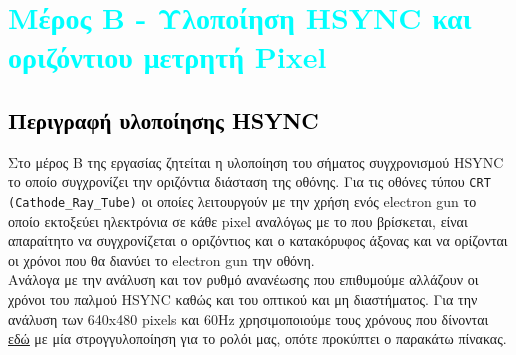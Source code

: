 \documentclass[12pt,a4paper]{article}
\begin{document}
	
	
	\section{\textcolor{cyan}{Μέρος Β - Υλοποίηση HSYNC και οριζόντιου μετρητή Pixel} }
	\subsection{\textcolor{black}{Περιγραφή υλοποίησης HSYNC}}
	Στο μέρος Β της εργασίας ζητείται η υλοποίηση του σήματος συγχρονισμού HSYNC το οποίο συγχρονίζει την οριζόντια διάσταση της οθόνης. Για τις οθόνες τύπου \verb|CRT| \verb*|(Cathode_Ray_Tube)| οι οποίες λειτουργούν με την χρήση ενός electron gun το οποίο εκτοξεύει ηλεκτρόνια σε κάθε pixel αναλόγως με το που βρίσκεται, είναι απαραίτητο να συγχρονίζεται ο οριζόντιος και ο κατακόρυφος άξονας και να ορίζονται οι χρόνοι που θα διανύει το electron gun την οθόνη.\\
	Ανάλογα με την ανάλυση και τον ρυθμό ανανέωσης που επιθυμούμε αλλάζουν οι χρόνοι του παλμού HSYNC καθώς και του οπτικού και μη διαστήματος. Για την ανάλυση των 640x480 pixels και 60Hz χρησιμοποιούμε τους χρόνους που δίνονται \href{http://tinyvga.com/vga-timing/640x480@60Hz}{\underline{εδώ}} με μία στρογγυλοποίηση για το ρολόι μας, οπότε προκύπτει ο παρακάτω πίνακας.
	
\end{document}
